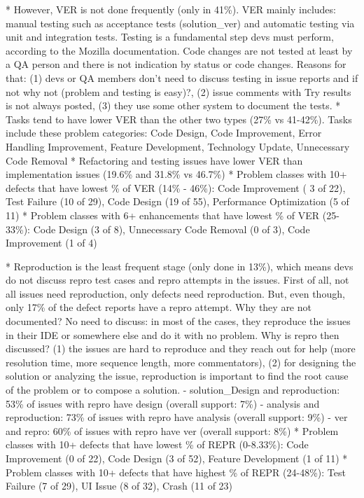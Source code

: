 \begin{itemize}
\begin{itemize}
		* However, VER is not done frequently (only in 41\%). VER mainly includes: manual testing such as acceptance tests (solution\_ver) and automatic testing via unit and integration tests. Testing is a fundamental step devs must perform, according to the Mozilla documentation. Code changes are not tested at least by a QA person and there is not indication by status or code changes. Reasons for that: (1) devs or QA members don't need to discuss testing in issue reports and if not why not (problem and testing is easy)?, (2) issue comments with Try results is not always posted, (3) they use some other system to document the tests. 
		* Tasks tend to have lower VER than the other two types (27\% vs 41-42\%). Tasks include these problem categories: Code Design, Code Improvement, 	Error Handling Improvement, Feature Development, Technology Update, Unnecessary Code Removal
		* Refactoring and testing issues have lower VER than implementation issues (19.6\% and 31.8\% vs 46.7\%)
		* Problem classes with 10+ defects that have lowest \% of VER (14\% - 46\%): Code Improvement ( 3 of 22), Test Failure (10 of 29), Code Design (19 of 55), Performance Optimization (5 of 11)
		* Problem classes with 6+ enhancements that have lowest \% of VER (25-33\%): Code Design (3 of 8), 
		Unnecessary Code Removal (0 of 3),  Code Improvement (1 of 4)
		
		* Reproduction is the least frequent stage (only done in 13\%), which means devs do not discuss repro test cases and repro attempts in the issues. First of all, not all issues need reproduction, only defects need reproduction.  But, even though, only 17\% of the defect reports have a repro attempt.  Why they are not documented?  No need to discuss: in most of the cases, they reproduce the issues in their IDE or somewhere else and do it with no problem. Why is repro then discussed? (1) the issues are hard to reproduce and they reach out for help (more resolution time, more sequence length, more commentators), (2) for designing the solution or analyzing the issue, reproduction is important to find the root cause of the problem or to compose a solution.
		- solution\_Design and reproduction: 53\% of issues with repro have design (overall support: 7\%)
		- analysis and reproduction: 73\% of issues with repro have analysis (overall support: 9\%)
		- ver and repro: 60\% of issues with repro have ver (overall support: 8\%)
		* Problem classes with 10+ defects that have lowest \% of REPR (0-8.33\%): Code Improvement (0 of 22), Code Design (3 of 52), Feature Development (1 of 11)
		* Problem classes with 10+ defects that have highest \% of REPR (24-48\%): Test Failure (7 of 29), UI Issue (8 of 32), Crash (11 of 23)
		

\end{itemize}
\end{itemize}
